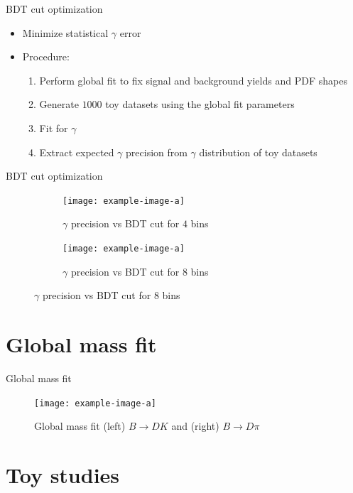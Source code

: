 \documentclass{beamer}
\begin{document}
\begin{frame}{BDT cut optimization}
  \begin{itemize}
    \setlength\itemsep{1.5em}
    \item{Minimize statistical $\gamma$ error}
    \item{Procedure:}
    \begin{enumerate}
      \item{Perform global fit to fix signal and background yields and PDF shapes}
      \item{Generate $1000$ toy datasets using the global fit parameters}
      \item{Fit for $\gamma$}
      \item{Extract expected $\gamma$ precision from $\gamma$ distribution of toy datasets}
    \end{enumerate}
  \end{itemize}
\end{frame}

\begin{frame}{BDT cut optimization}
  \begin{figure}
    \centering
    \vspace{-0.2cm}
    \begin{subfigure}{0.5\textwidth}
      \texttt{[image: example-image-a]}
      \caption{$\gamma$ precision vs BDT cut for $4$ bins}
    \end{subfigure}%
    \begin{subfigure}{0.5\textwidth}
      \texttt{[image: example-image-a]}
      \caption{$\gamma$ precision vs BDT cut for $8$ bins}
    \end{subfigure}
  \end{figure}
\end{frame}

\section{Global mass fit}
\begin{frame}{Global mass fit}
  \begin{figure}
    \centering
    \texttt{[image: example-image-a]}
    \caption{Global mass fit (left) $B\to DK$ and (right) $B\to D\pi$}
  \end{figure}
\end{frame}

\section{Toy studies}
\end{document}
